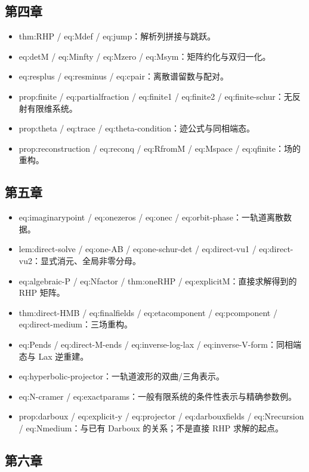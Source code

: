 \subsection{第四章}

\begin{itemize}[leftmargin=2em]
\item thm:RHP / eq:Mdef / eq:jump：解析列拼接与跳跃。
\item eq:detM / eq:Minfty / eq:Mzero / eq:Msym：矩阵约化与双归一化。
\item eq:resplus / eq:resminus / eq:cpair：离散谱留数与配对。
\item prop:finite / eq:partialfraction / eq:finite1 / eq:finite2 / eq:finite-schur：无反射有限维系统。
\item prop:theta / eq:trace / eq:theta-condition：迹公式与同相端态。
\item prop:reconstruction / eq:reconq / eq:RfromM / eq:Mspace / eq:qfinite：场的重构。
\end{itemize}

\subsection{第五章}

\begin{itemize}[leftmargin=2em]
\item eq:imaginarypoint / eq:onezeros / eq:onec / eq:orbit-phase：一轨道离散数据。
\item lem:direct-solve / eq:one-AB / eq:one-schur-det / eq:direct-vu1 / eq:direct-vu2：显式消元、全局非零分母。
\item eq:algebraic-P / eq:Nfactor / thm:oneRHP / eq:explicitM：直接求解得到的 RHP 矩阵。
\item thm:direct-HMB / eq:finalfields / eq:etacomponent / eq:pcomponent / eq:direct-medium：三场重构。
\item eq:Pends / eq:direct-M-ends / eq:inverse-log-lax / eq:inverse-V-form：同相端态与 Lax 逆重建。
\item eq:hyperbolic-projector：一轨道波形的双曲/三角表示。
\item eq:N-cramer / eq:exactparams：一般有限系统的条件性表示与精确参数例。
\item prop:darboux / eq:explicit-y / eq:projector / eq:darbouxfields / eq:Nrecursion / eq:Nmedium：与已有 Darboux 的关系；不是直接 RHP 求解的起点。
\end{itemize}

\subsection{第六章}

